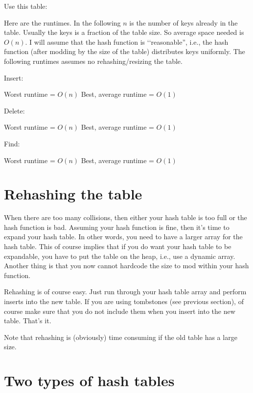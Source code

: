 Use this table:


Here are the runtimes.
In the following $n$ is the number of keys already in the table.
Usually the keys is a fraction of the table size.
So average space needed is $O(n)$.
I will assume that the hash function is \lq\lq reasonable'', i.e.,
the hash function (after modding by the size of the table)
distributes keys uniformly.
The following runtimes assumes no rehashing/resizing the table.
\begin{enumerate}
  \li Insert:
  \begin{tightlist}
    \li Worst runtime = $O(n)$
    \li Best, average runtime = $O(1)$
  \end{tightlist}
  \li Delete:
  \begin{tightlist}
    \li Worst runtime = $O(n)$
    \li Best, average runtime = $O(1)$
  \end{tightlist}
  \li Find:
  \begin{tightlist}
    \li Worst runtime = $O(n)$
    \li Best, average runtime = $O(1)$
  \end{tightlist}
\end{enumerate}


\newpage
\section{Rehashing the table}

When there are too many collisions, then either your hash table is
too full or the hash function is bad.
Assuming your hash function is fine, then it's time to expand your
hash table.
In other words, you need to have a larger array for the hash table.
This of course implies that if you do want your hash table
to be expandable, you have to put the table on the heap, i.e.,
use a dynamic array.
Another thing is that you now cannot hardcode the size to mod within
your hash function. 

Rehashing is of course easy.
Just run through your hash table array and perform inserts into the new
table.
If you are using tombstones (see previous section), of course make
sure that you do not include them when you insert into the new table.
That's it.

Note that rehashing is (obviously) time consuming if the old table
has a large size.




\newpage
\section{Two types of hash tables}

